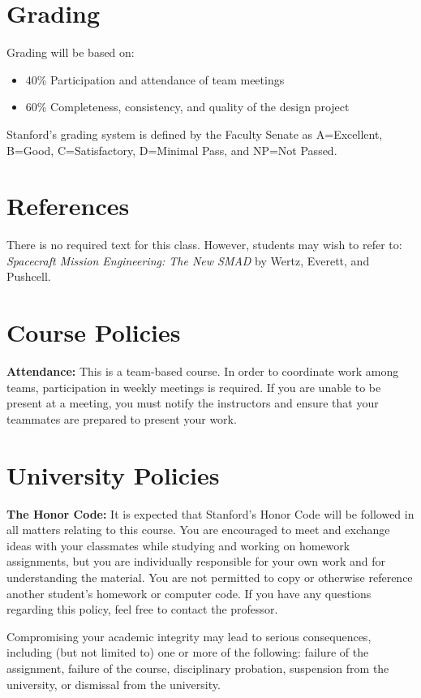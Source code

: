 \documentclass[11pt,letterpaper]{article}
\begin{document}
\section*{Grading}

Grading will be based on:
\begin{itemize}
	\item 40\% Participation and attendance of team meetings
	\item 60\% Completeness, consistency, and quality of the design project
\end{itemize}
Stanford's grading system is defined by the Faculty Senate as A=Excellent, B=Good, C=Satisfactory, D=Minimal Pass, and NP=Not Passed.

\section*{References}

There is no required text for this class. However, students may wish to refer to: \textit{Spacecraft Mission Engineering: The New SMAD} by Wertz, Everett, and Pushcell.

\section*{Course Policies}

\textbf{Attendance:} This is a team-based course. In order to coordinate work among teams, participation in weekly meetings is required. If you are unable to be present at a meeting, you must notify the instructors and ensure that your teammates are prepared to present your work.

\section*{University Policies}

\textbf{The Honor Code:} It is expected that Stanford's Honor Code will be followed in all matters relating to this course. You are encouraged to meet and exchange ideas with your classmates while studying and working on homework assignments, but you are individually responsible for your own work and for understanding the material. You are not permitted to copy or otherwise reference another student's homework or computer code. If you have any questions regarding this policy, feel free to contact the professor.

Compromising your academic integrity may lead to serious consequences, including (but not limited to) one or more of the following: failure of the assignment, failure of the course, disciplinary probation, suspension from the university, or dismissal from the university.
\end{document}
